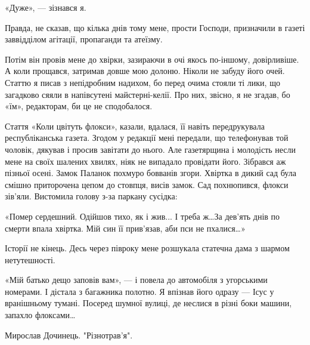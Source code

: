 «Дуже», --- зізнався я.

Правда, не сказав, що кілька днів тому мене, прости Господи, призначили в
газеті заввідділом агітації, пропаганди та атеїзму.

Потім він провів мене до хвірки, зазираючи в очі якось по-іншому, довірливіше.
А коли прощався, затримав довше мою долоню. Ніколи не забуду його очей. Статтю
я писав з непідробним надихом, бо перед очима стояли ті лики, що загадково
сяяли в напівсутені майстерні-келії. Про них, звісно, я не згадав, бо «їм»,
редакторам, би це не сподобалося.

Стаття «Коли цвітуть флокси», казали, вдалася, її навіть передрукувала
республіканська газета. Згодом у редакції мені передали, що телефонував той
чоловік, дякував і просив завітати до нього. Але газетярщина і молодість несли
мене на своїх шалених хвилях, ніяк не випадало провідати його. Зібрався аж
пізньої осені. Замок Паланок похмуро бовванів згори. Хвіртка в дикий сад була
смішно приторочена цепом до стовпця, висів замок. Сад похнюпився, флокси
зів’яли. Вистомила голову з-за паркану сусідка:

«Помер сердешний. Одійшов тихо, як і жив... І треба ж…За дев’ять днів по
смерти впала хвіртка. Мій син її прив’язав, аби пси не пхалися…»

 Історії не кінець. Десь через півроку мене розшукала статечна дама з шармом
 нетутешності.

«Мій батько дещо заповів вам», --- і повела до автомобіля з угорськими номерами.
І дістала з багажника полотно. Я впізнав його одразу --- Ісус у вранішньому
тумані. Посеред шумної вулиці, де неслися в різні боки машини, запахло
флоксами…

Мирослав Дочинець. "Різнотрав'я".
